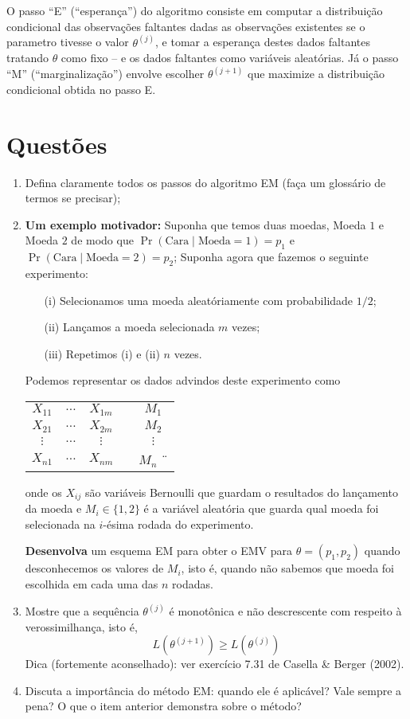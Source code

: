 \documentclass[a4paper,10pt, notitlepage]{report}
\begin{document}
O passo ``E'' (``esperança'') do algoritmo consiste em computar a distribuição condicional das observações faltantes dadas as observações existentes se o parametro tivesse o valor $\theta^{(j)}$,  e tomar a esperança destes dados faltantes tratando $\theta$ como fixo -- e os dados faltantes como variáveis aleatórias.
Já o passo ``M'' (``marginalização'') envolve escolher $\theta^{(j+1)}$ que maximize a distribuição condicional obtida no passo E. 

\section*{Questões}
\begin{enumerate}
 \item Defina claramente todos os passos do algoritmo EM (faça um glossário de termos se precisar);
 \item \textbf{Um exemplo motivador:} Suponha que temos duas moedas, Moeda $1$ e Moeda $2$ de modo que $\operatorname{Pr}(\text{Cara} \mid \text{Moeda} = 1) = p_1$ e $\operatorname{Pr}(\text{Cara} \mid \text{Moeda} = 2) = p_2$; 
 Suponha agora que fazemos o seguinte experimento:
 \begin{itemize}
  \item[(i)] Selecionamos uma moeda aleatóriamente com probabilidade $1/2$;
  \item[(ii)] Lançamos a moeda selecionada $m$ vezes;
  \item[(iii)] Repetimos (i) e (ii) $n$ vezes.
 \end{itemize}
 Podemos representar os dados advindos deste experimento como 
\begin{center}
\begin{tabular}{ c c c c c}
 $X_{11}$ & $\ldots$ & $X_{1m}$ & & $M_1$  \\ 
 $X_{21}$ & $\ldots$ & $X_{2m}$ & & $M_2$  \\
 $\vdots$ & $\ldots$ & $\vdots$ & & $\vdots$  \\
 $X_{n1}$ & $\ldots$ & $X_{nm}$ & & $M_n$ ¨
\end{tabular}
\end{center}
 
 onde os $X_{ij}$ são variáveis Bernoulli que guardam o resultados do lançamento da moeda  e $M_i \in \{ 1, 2\}$ é a variável aleatória que guarda qual moeda foi selecionada na $i$-ésima rodada do experimento.
 
 \textbf{Desenvolva} um esquema EM para obter o EMV para $\theta = (p_1, p_2)$ quando desconhecemos os valores de $M_i$, isto é, quando não sabemos que moeda foi escolhida em cada uma das $n$ rodadas.
 
 \item Mostre que a sequência $\theta^{(j)}$ é monotônica e não descrescente com respeito à verossimilhança, isto é,
 \[ L\left(\theta^{(j + 1)}\right) \geq L\left(\theta^{(j)}\right) \]
 Dica (fortemente aconselhado): ver exercício 7.31 de Casella \& Berger (2002). 
 \item Discuta a importância do método EM: quando ele é aplicável? Vale sempre a pena? O que o item anterior demonstra sobre o método?
\end{enumerate}


%
%
\end{document}
